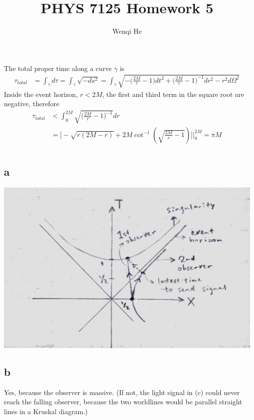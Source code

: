 \documentclass{article}
\title{PHYS 7125 Homework 5}
\author{Wenqi He}
\begin{document}
\maketitle
\section{}
The total proper time along a curve $\gamma$ is
\begin{align*}
\tau_{total} &= \int_\gamma d\tau = \int_\gamma \sqrt{-ds^2} 
= \int_\gamma \sqrt{-\Big(\frac{2M}{r} - 1\Big)dt^2 + \Big(\frac{2M}{r} -1 \Big)^{-1} dr^2 - r^2d\Omega^2}
\end{align*}
Inside the event horizon, $r < 2M$, the first and third term in the square root are negative, therefore
\begin{align*}
\tau_{total} &< \int^{2M}_0 \sqrt{\Big(\frac{2M}{r} -1 \Big)^{-1}} dr  \\
&= \Bigg[ -\sqrt{r(2M-r)} + 2M\cot^{-1}\left(\sqrt{\frac{2M}{r}-1} \right) \Bigg] \Bigg\rvert^{2M}_0 = \pi M
\end{align*}
\section{}
\subsection*{a}
\includegraphics[width=\textwidth]{diagram.jpg}
\subsection*{b}
Yes, because the observer is massive. (If not, the light signal in (c) could never reach the falling observer, because the two worldlines would be parallel straight lines in a Kruskal diagram.)
\end{document}
